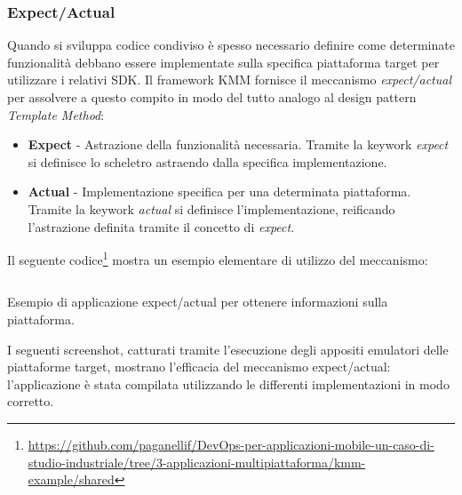 \subsubsection{Expect/Actual}
Quando si sviluppa codice condiviso è spesso necessario definire come determinate funzionalità debbano essere implementate sulla specifica piattaforma target per utilizzare i relativi SDK. Il framework KMM fornisce il meccanismo \textit{expect/actual} per assolvere a questo compito in modo del tutto analogo al design pattern \textit{Template Method}:
\begin{itemize}
    \item \textbf{Expect} - Astrazione della funzionalità necessaria. Tramite la keywork \textit{expect} si definisce lo scheletro astraendo dalla specifica implementazione.
    \item \textbf{Actual} - Implementazione specifica per una determinata piattaforma. Tramite la keywork \textit{actual} si definisce l'implementazione, reificando l'astrazione definita tramite il concetto di \textit{expect}.
\end{itemize}

Il seguente codice\footnote{\href{https://github.com/paganellif/DevOps-per-applicazioni-mobile-un-caso-di-studio-industriale/tree/3-applicazioni-multipiattaforma/kmm-example/shared}{https://github.com/paganellif/DevOps-per-applicazioni-mobile-un-caso-di-studio-industriale/tree/3-applicazioni-multipiattaforma/kmm-example/shared}} mostra un esempio elementare di utilizzo del meccanismo:

\begin{listing}[H]
    \inputminted{kotlin}{code/3-expectactual}
    \caption{Esempio di applicazione expect/actual per ottenere informazioni sulla piattaforma.}
\end{listing}

I seguenti screenshot, catturati tramite l'esecuzione degli appositi emulatori delle piattaforme target, mostrano l'efficacia del meccanismo expect/actual: l'applicazione è stata compilata utilizzando le differenti implementazioni in modo corretto.


